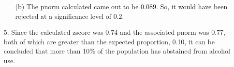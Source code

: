 \documentclass[12pt]{article}
\begin{document}
\begin{enumerate}
\begin{enumerate}
			\item[(b)] The pnorm calculated came out to be 0.089. So, 
				it would have been rejected at a significance level of 0.2.
		\end{enumerate}
	\item[5.] Since the calculated zscore was 0.74 and the associated pnorm was 0.77, both of which are greater than
		the expected proportion, 0.10, it can be concluded that more than 10\% of the population has abstained from alcohol use.
\end{enumerate}
\end{document}
